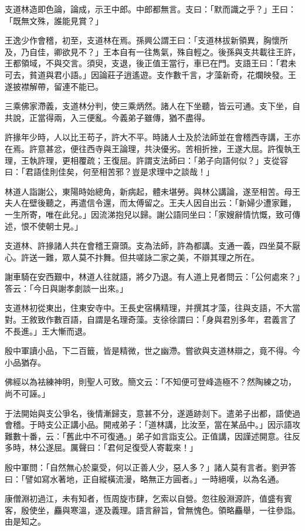 支道林造即色論，論成，示王中郎。中郎都無言。支曰：「默而識之乎？」王曰：「既無文殊，誰能見賞？」

王逸少作會稽，初至，支道林在焉。孫興公謂王曰：「支道林拔新領異，胸懷所及，乃自佳，卿欲見不？」王本自有一往雋氣，殊自輕之。後孫與支共載往王許，王都領域，不與交言。須臾，支退，後正值王當行，車已在門。支語王曰：「君未可去，貧道與君小語。」因論莊子逍遙遊。支作數千言，才藻新奇，花爛映發。王遂披襟解帶，留連不能已。

三乘佛家滯義，支道林分判，使三乘炳然。諸人在下坐聽，皆云可通。支下坐，自共說，正當得兩，入三便亂。今義弟子雖傳，猶不盡得。

許掾年少時，人以比王苟子，許大不平。時諸人士及於法師並在會稽西寺講，王亦在焉。許意甚忿，便往西寺與王論理，共決優劣。苦相折挫，王遂大屈。許復執王理，王執許理，更相覆疏；王復屈。許謂支法師曰：「弟子向語何似？」支從容曰：「君語佳則佳矣，何至相苦邪？豈是求理中之談哉！」

林道人詣謝公，東陽時始總角，新病起，體未堪勞。與林公講論，遂至相苦。母王夫人在壁後聽之，再遣信令還，而太傅留之。王夫人因自出云：「新婦少遭家難，一生所寄，唯在此兒。」因流涕抱兒以歸。謝公語同坐曰：「家嫂辭情忼慨，致可傳述，恨不使朝士見。」

支道林、許掾諸人共在會稽王齋頭。支為法師，許為都講。支通一義，四坐莫不厭心。許送一難，眾人莫不抃舞。但共嗟詠二家之美，不辯其理之所在。

謝車騎在安西艱中，林道人往就語，將夕乃退。有人道上見者問云：「公何處來？」答云：「今日與謝孝劇談一出來。」

支道林初從東出，住東安寺中。王長史宿構精理，并撰其才藻，往與支語，不大當對。王敘致作數百語，自謂是名理奇藻。支徐徐謂曰：「身與君別多年，君義言了不長進。」王大慚而退。

殷中軍讀小品，下二百籤，皆是精微，世之幽滯。嘗欲與支道林辯之，竟不得。今小品猶存。

佛經以為袪練神明，則聖人可致。簡文云：「不知便可登峰造極不？然陶練之功，尚不可誣。」

于法開始與支公爭名，後情漸歸支，意甚不分，遂遁跡剡下。遣弟子出都，語使過會稽。于時支公正講小品。開戒弟子：「道林講，比汝至，當在某品中。」因示語攻難數十番，云：「舊此中不可復通。」弟子如言詣支公。正值講，因謹述開意。往反多時，林公遂屈。厲聲曰：「君何足復受人寄載來！」

殷中軍問：「自然無心於稟受，何以正善人少，惡人多？」諸人莫有言者。劉尹答曰：「譬如寫水著地，正自縱橫流漫，略無正方圓者。」一時絕嘆，以為名通。

康僧淵初過江，未有知者，恆周旋市肆，乞索以自營。忽往殷淵源許，值盛有賓客，殷使坐，麤與寒溫，遂及義理。語言辭旨，曾無愧色。領略麤舉，一往參詣。由是知之。

